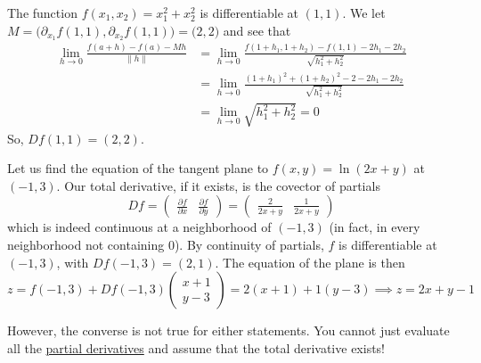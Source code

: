   \begin{example}
    \label{ex:computing-total-derivative}
    The function $f(x_1, x_2) = x_1^2 + x_2^2$ is differentiable at $(1, 1)$. We let $M = \big(\partial_{x_1} f(1, 1), \partial_{x_2} f(1, 1) \big) = \big(2, 2\big)$ and see that 
    \begin{align}
      \lim_{h \rightarrow 0} \frac{f(a + h) - f(a) - M h}{\|h\|} & = \lim_{h \rightarrow 0} \frac{f(1 + h_1, 1 + h_2) - f(1, 1) - 2 h_1 - 2 h_2}{\sqrt{h_1^2 + h_2^2}} \\
      & = \lim_{h \rightarrow 0} \frac{(1 + h_1)^2 + (1 + h_2)^2 - 2 - 2 h_1 - 2 h_2}{\sqrt{h_1^2 + h_2^2}} \\
      & = \lim_{h \rightarrow 0} \sqrt{h_1^2 + h_2^2} = 0
    \end{align}
    So, $D f (1, 1) = (2, 2)$. 
  \end{example}

  \begin{example}
    \label{ex:computing-tangent-plane}
    Let us find the equation of the tangent plane to $f(x, y) = \ln(2x + y)$ at $(-1, 3)$. Our total derivative, if it exists, is the covector of partials
    \begin{equation}
      D f = \begin{pmatrix} \frac{\partial f}{\partial x} & \frac{\partial f}{\partial y} \end{pmatrix} = \begin{pmatrix} \frac{2}{2x + y} & \frac{1}{2x + y} \end{pmatrix}
    \end{equation}
    which is indeed continuous at a neighborhood of $(-1, 3)$ (in fact, in every neighborhood not containing $0$). By continuity of partials, $f$ is differentiable at $(-1, 3)$, with $D f(-1, 3) = (2, 1)$. The equation of the plane is then 
    \begin{equation}
      z = f(-1, 3) + D f(-1, 3) \begin{pmatrix} x + 1\\ y - 3 \end{pmatrix} = 2(x + 1) + 1 (y - 3) \implies z = 2x + y - 1
    \end{equation}
  \end{example}

  However, the converse is not true for either statements. You cannot just evaluate all the \hyperref[def:partial-derivative]{partial derivatives} and assume that the total derivative exists!  

